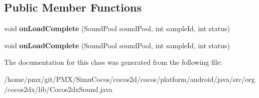 \subsection*{Public Member Functions}
\begin{DoxyCompactItemize}
\item 
\mbox{\label{classorg_1_1cocos2dx_1_1lib_1_1Cocos2dxSound_1_1OnLoadCompletedListener_a1db34cda5fa713e48b0c8999f1a4c091}} 
void {\bfseries on\+Load\+Complete} (Sound\+Pool sound\+Pool, int sample\+Id, int status)
\item 
\mbox{\label{classorg_1_1cocos2dx_1_1lib_1_1Cocos2dxSound_1_1OnLoadCompletedListener_a1db34cda5fa713e48b0c8999f1a4c091}} 
void {\bfseries on\+Load\+Complete} (Sound\+Pool sound\+Pool, int sample\+Id, int status)
\end{DoxyCompactItemize}


The documentation for this class was generated from the following file\+:\begin{DoxyCompactItemize}
\item 
/home/pmx/git/\+P\+M\+X/\+Simu\+Cocos/cocos2d/cocos/platform/android/java/src/org/cocos2dx/lib/Cocos2dx\+Sound.\+java\end{DoxyCompactItemize}
